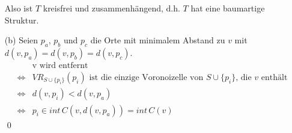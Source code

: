 \documentclass{article}
\begin{document}
\begin{itemize}
Also ist $T$ kreisfrei und zusammenh\"angend, d.h. $T$ hat eine baumartige Struktur.
\item[(b)] Seien $p_a$, $p_b$ und $p_c$ die Orte mit minimalem Abstand zu $v$ mit $d(v,p_a) = d(v,p_b) = d(v,p_c)$.
\begin{eqnarray*}
&& \text{v wird entfernt}\\
&\Leftrightarrow& VR_{S\cup\{p_i\}}(p_i)\text{ ist die einzige Voronoizelle von $S\cup\{p_i\}$, die }v\text{ enth\"alt}\\
&\Leftrightarrow & d(v,p_i) < d(v,p_a)\\
&\Leftrightarrow & p_i \in int\,C(v,d(v,p_a)) = int\,C(v)
\end{eqnarray*}\qed
\end{itemize}
\end{document}
